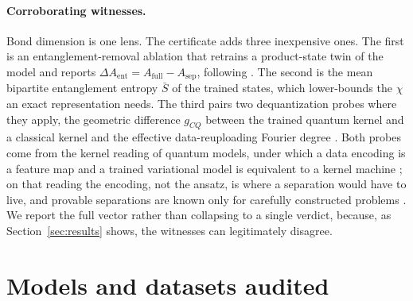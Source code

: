 \documentclass[10pt]{article}
\begin{document}
\paragraph{Corroborating witnesses.} Bond dimension is one lens. The certificate adds three
inexpensive ones. The first is an entanglement-removal ablation that retrains a product-state twin
of the model and reports $\Delta A_{\mathrm{ent}}=A_{\mathrm{full}}-A_{\mathrm{sep}}$, following
\citet{bowles2024}. The second is the mean bipartite entanglement entropy $\bar S$ of the trained
states, which lower-bounds the $\chi$ an exact representation needs. The third pairs two
dequantization probes where they apply, the geometric difference $g_{CQ}$ between the trained
quantum kernel and a classical kernel \citep{huang2021} and the effective data-reuploading Fourier
degree \citep{schuld2021}. Both probes come from the kernel reading of quantum models, under which
a data encoding is a feature map \citep{havlicek2019,schuld2019} and a trained variational model is
equivalent to a kernel machine \citep{schuld2021kernel}; on that reading the encoding, not the
ansatz, is where a separation would have to live, and provable separations are known only for
carefully constructed problems \citep{liu2021}. We report the full vector rather than collapsing to a single verdict,
because, as Section~\ref{sec:results} shows, the witnesses can legitimately disagree.

\section{Models and datasets audited}
\label{sec:models}
\end{document}

